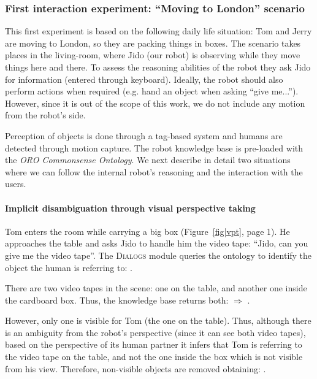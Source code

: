 \subsubsection{First interaction experiment: ``Moving to London'' scenario}
\label{sect|expe1}

This first experiment is based on the following daily life situation: Tom and
Jerry are moving to London, so they are packing things in boxes. The scenario
takes places in the living-room, where Jido (our robot) is observing while they
move things here and there. To assess the reasoning abilities of the robot they
ask Jido for information (entered through keyboard). Ideally, the robot should
also perform actions when required (e.g. hand an object when asking ``give
me...''). However, since it is out of the scope of this work, we do not include
any motion from the robot's side.

Perception of objects is done through a tag-based system and humans are
detected through motion capture. The robot knowledge base is pre-loaded with
the \emph{ORO Commonsense Ontology}.  We next describe in detail two
situations where we can follow the internal robot's reasoning and the
interaction with the users.

\paragraph{Implicit disambiguation through visual perspective taking}

Tom enters the room while carrying a big box (Figure~\ref{fig|vpt}, page 1). He
approaches the table and asks Jido to handle him the video tape: ``Jido, can
you give me the video tape''. The \textsc{Dialogs} module queries the ontology to
identify the object the human is referring to: . 

There are two video tapes in the scene: one on the table, and another one
inside the cardboard box. Thus, the knowledge base returns both: $\Rightarrow$
. 

However, only one is visible for Tom (the one on the
table). Thus, although there is an ambiguity from the robot's perspective
(since it can see both video tapes), based on the perspective of its human
partner it infers that Tom is referring to the video tape on the table, and not
the one inside the box which is not visible from his view. Therefore,
non-visible objects are removed obtaining: .

